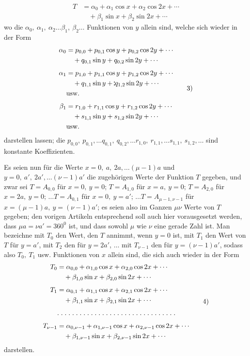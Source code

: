 \begin{landscape}
\[
\begin{aligned}
T&=\alpha_0+\alpha_1\cos x+\alpha_2\cos2x+\cdots\\
 &\quad+\beta_1\sin x+\beta_2\sin2x+\cdots
\end{aligned}\tag*{2)}
\]
wo die \(\alpha_0,\ \alpha_1,\ \alpha_2\ldots\beta_1,\ \beta_2\ldots\) Funktionen von \(y\) allein sind, welche sich wieder in der Form
\[
\begin{aligned}
\alpha_0&=p_{0,0}+p_{0,1}\cos y+p_{0,2}\cos2y+\cdots\\
 &\quad+q_{0,1}\sin y+q_{0,2}\sin2y+\cdots\\[4pt]
\alpha_1&=p_{1,0}+p_{1,1}\cos y+p_{1,2}\cos2y+\cdots\\
 &\quad+q_{1,1}\sin y+\VFivePair q_{1,2}\sin2y+\cdots\\
 &\text{usw.}\\[4pt]
\beta_1&=r_{1,0}+r_{1,1}\cos y+r_{1,2}\cos2y+\cdots\\
 &\quad+s_{1,1}\sin y+s_{1,2}\sin2y+\cdots\\
 &\text{usw.}
\end{aligned}\tag*{3)}
\]
darstellen lassen; die \(p_{0,0},\ p_{0,1},\ldots q_{0,1},\ q_{0,2},\ldots r_{1,0},\ r_{1,1},\ldots s_{1,1},\ s_{1,2},\ldots\) sind konstante Koeffizienten.

\par\noindent\hspace*{\parindent}Es seien nun für die Werte \(x=0,\ a,\ 2a,\ldots(\mu-1)a\) und \(y=0,\ a',\ 2a',\ldots(\nu-1)a'\) die zugehörigen Werte der Funktion \(T\) gegeben, und zwar sei \(T=A_{0,0}\) für \(x=0,\ y=0\); \(T=A_{1,0}\) für \(x=a,\ y=0\); \(T=A_{2,0}\) für \(x=2a,\ y=0\); \(\ldots T=A_{0,1}\) für \(x=0,\ y=a'\); \(\ldots T=A_{\mu-1,\nu-1}\) für \(x=(\mu-1)a,\ y=(\nu-1)a'\); es seien also im Ganzen \(\mu\nu\) Werte von \(T\) gegeben; den vorigen Artikeln entsprechend soll auch hier vorausgesetzt werden, dass \(\mu a=\nu a'=360^0\) ist, und dass sowohl \(\mu\) wie \(\nu\) eine gerade Zahl ist. Man bezeichne mit \(T_0\) den Wert, den \(T\) annimmt, wenn \(y=0\) ist, mit \(T_1\) den Wert von \(T\) für \(y=a'\), mit \(T_2\) den für \(y=2a'\), \(\ldots\) mit \(T_{\nu-1}\) den für \(y=(\nu-1)a'\), sodass also \(T_0,\ T_1\) usw. Funktionen von \(x\) allein sind, die sich auch wieder in der Form
\[
\begin{aligned}
T_0&=\alpha_{0,0}+\alpha_{1,0}\cos x+\alpha_{2,0}\cos2x+\cdots\\
 &\quad+\beta_{1,0}\sin x+\beta_{2,0}\sin2x+\cdots\\[4pt]
T_1&=\alpha_{0,1}+\alpha_{1,1}\cos x+\alpha_{2,1}\cos2x+\cdots\\
 &\quad+\beta_{1,1}\sin x+\beta_{2,1}\sin2x+\cdots\\[4pt]
 &\mathord{.}\mkern5mu\mathord{.}\mkern5mu\mathord{.}\mkern5mu\mathord{.}\mkern5mu\mathord{.}\mkern5mu\mathord{.}\mkern5mu\mathord{.}\mkern5mu\mathord{.}\mkern5mu\mathord{.}\mkern5mu\mathord{.}\mkern5mu\mathord{.}\mkern5mu\mathord{.}\mkern5mu\mathord{.}\mkern5mu\mathord{.}\mkern5mu\mathord{.}\mkern5mu\mathord{.}\mkern5mu\mathord{.}\mkern5mu\mathord{.}\mkern5mu\mathord{.}\mkern5mu\mathord{.}\mkern5mu\mathord{.}\mkern5mu\mathord{.}\mkern5mu\mathord{.}\mkern5mu\mathord{.}\mkern5mu\mathord{.}\mkern5mu\mathord{.}\mkern5mu\mathord{.}\mkern5mu\mathord{.}\mkern5mu\mathord{.}\mkern5mu\mathord{.}\mkern5mu\mathord{.}\mkern5mu\mathord{.}\mkern5mu\\[4pt]
T_{\nu-1}&=\alpha_{0,\nu-1}+\alpha_{1,\nu-1}\cos x+\alpha_{2,\nu-1}\cos2x+\cdots\\
 &\quad+\beta_{1,\nu-1}\sin x+\beta_{2,\nu-1}\sin2x+\cdots
\end{aligned}\tag*{4)}
\]
darstellen.


\end{landscape}
